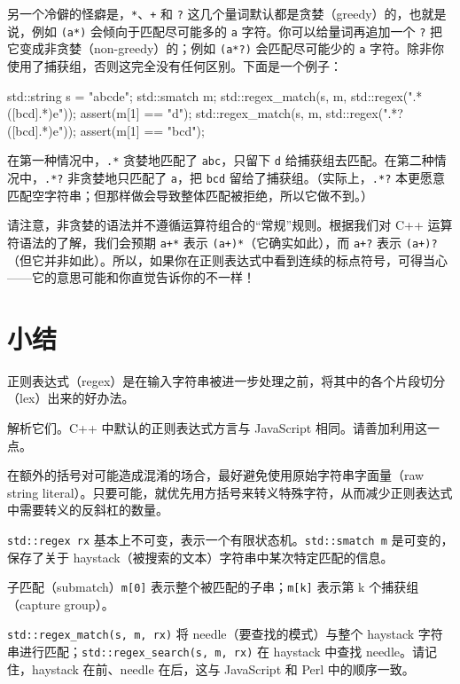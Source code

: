 另一个冷僻的怪癖是，\texttt{*}、\texttt{+} 和 \texttt{?} 这几个量词默认都是贪婪（greedy）的，也就是说，例如 \texttt{(\allowbreak{}a*)\allowbreak{}} 会倾向于匹配尽可能多的 \texttt{a} 字符。你可以给量词再追加一个 \texttt{?} 把它变成非贪婪（non-greedy）的；例如 \texttt{(\allowbreak{}a*?)\allowbreak{}} 会匹配尽可能少的 \texttt{a} 字符。除非你使用了捕获组，否则这完全没有任何区别。下面是一个例子：

\begin{codebox}[cpp]
    std::string s = "abcde";
    std::smatch m;
    std::regex_match(s, m, std::regex(".*([bcd].*)e"));
    assert(m[1] == "d");
    std::regex_match(s, m, std::regex(".*?([bcd].*)e"));
    assert(m[1] == "bcd");
\end{codebox}

在第一种情况中，\texttt{.*} 贪婪地匹配了 \texttt{abc}，只留下 \texttt{d} 给捕获组去匹配。在第二种情况中，\texttt{.*?} 非贪婪地只匹配了 \texttt{a}，把 \texttt{bcd} 留给了捕获组。（实际上，\texttt{.*?} 本更愿意匹配空字符串；但那样做会导致整体匹配被拒绝，所以它做不到。）

请注意，非贪婪的语法并不遵循运算符组合的“常规”规则。根据我们对 C++ 运算符语法的了解，我们会预期 \texttt{a+*} 表示 \texttt{(\allowbreak{}a+)\allowbreak{}*}（它确实如此），而 \texttt{a+?} 表示 \texttt{(\allowbreak{}a+)\allowbreak{}?}（但它并非如此）。所以，如果你在正则表达式中看到连续的标点符号，可得当心——它的意思可能和你直觉告诉你的不一样！

\section{小结}

正则表达式（regex）是在输入字符串被进一步处理之前，将其中的各个片段切分（lex）出来的好办法。

解析它们。C++ 中默认的正则表达式方言与 JavaScript 相同。请善加利用这一点。

在额外的括号对可能造成混淆的场合，最好避免使用原始字符串字面量（raw string literal）。只要可能，就优先用方括号来转义特殊字符，从而减少正则表达式中需要转义的反斜杠的数量。

\texttt{std::\allowbreak{}regex rx} 基本上不可变，表示一个有限状态机。\texttt{std::\allowbreak{}smatch m} 是可变的，保存了关于 haystack（被搜索的文本）字符串中某次特定匹配的信息。

子匹配（submatch）\texttt{m[0]} 表示整个被匹配的子串；\texttt{m[k]} 表示第 k 个捕获组（capture group）。

\texttt{std::\allowbreak{}regex\_\allowbreak{}match(\allowbreak{}s,\allowbreak{} m,\allowbreak{} rx)\allowbreak{}} 将 needle（要查找的模式）与整个 haystack 字符串进行匹配；\texttt{std::\allowbreak{}regex\_\allowbreak{}search(\allowbreak{}s,\allowbreak{} m,\allowbreak{} rx)\allowbreak{}} 在 haystack 中查找 needle。请记住，haystack 在前、needle 在后，这与 JavaScript 和 Perl 中的顺序一致。

